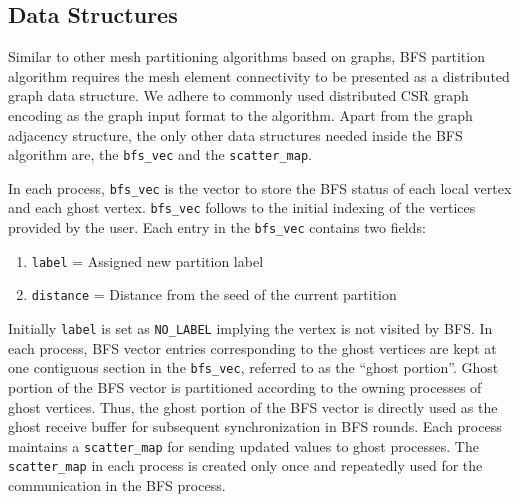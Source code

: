 \documentclass[conference]{IEEEtran}
\begin{document}
\subsection{Data Structures}
Similar to other mesh partitioning algorithms based on graphs, BFS partition algorithm requires the mesh element connectivity to be presented as a distributed graph data structure. We adhere to commonly used distributed CSR graph encoding as the graph input format to the algorithm. Apart from the graph adjacency structure, the only other data structures needed inside the BFS algorithm are, the \verb|bfs_vec| and the \verb|scatter_map|.
\par
In each process, \verb|bfs_vec| is the vector to store the BFS status of each local vertex and each ghost vertex. \verb|bfs_vec| follows to the initial indexing of the vertices provided by the user. Each entry in the \verb|bfs_vec| contains two fields: 
\begin{enumerate}
    \item \verb|label| = Assigned new partition label
    \item \verb|distance| = Distance from the seed of the current partition
\end{enumerate}
\par
Initially \verb|label| is set as \verb|NO_LABEL| implying the vertex is not visited by BFS. In each process, BFS vector entries corresponding to the ghost vertices are kept at one contiguous section in the \verb|bfs_vec|, referred to as the ``ghost portion''. Ghost portion of the BFS vector is partitioned according to the owning processes of ghost vertices. Thus, the ghost portion of the BFS vector is directly used as the ghost receive buffer for subsequent synchronization in BFS rounds. Each process maintains a \verb|scatter_map| for sending updated values to ghost processes. The \verb|scatter_map| in each process is created only once and repeatedly used for the communication in the BFS process.

\end{document}
